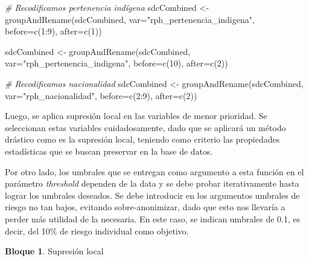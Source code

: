 \documentclass[
]{book}
\newenvironment{Shaded}{\begin{snugshade}}{\end{snugshade}}
\newcommand{\AttributeTok}[1]{\textcolor[rgb]{0.77,0.63,0.00}{#1}}
\newcommand{\CommentTok}[1]{\textcolor[rgb]{0.56,0.35,0.01}{\textit{#1}}}
\newcommand{\DecValTok}[1]{\textcolor[rgb]{0.00,0.00,0.81}{#1}}
\newcommand{\FunctionTok}[1]{\textcolor[rgb]{0.00,0.00,0.00}{#1}}
\newcommand{\NormalTok}[1]{#1}
\newcommand{\OtherTok}[1]{\textcolor[rgb]{0.56,0.35,0.01}{#1}}
\newcommand{\SpecialCharTok}[1]{\textcolor[rgb]{0.00,0.00,0.00}{#1}}
\newcommand{\StringTok}[1]{\textcolor[rgb]{0.31,0.60,0.02}{#1}}
\theoremstyle{definition}
\theoremstyle{definition}
\newtheorem{example}{Bloque}[chapter]
\theoremstyle{definition}
\theoremstyle{definition}
\theoremstyle{remark}
\begin{document}
\begin{Shaded}
\begin{Highlighting}[]
\CommentTok{\# Recodificamos pertenencia indígena}
\NormalTok{sdcCombined }\OtherTok{\textless{}{-}} \FunctionTok{groupAndRename}\NormalTok{(sdcCombined, }\AttributeTok{var=}\StringTok{"rph\_pertenencia\_indigena"}\NormalTok{,}
                              \AttributeTok{before=}\FunctionTok{c}\NormalTok{(}\DecValTok{1}\SpecialCharTok{:}\DecValTok{9}\NormalTok{), }\AttributeTok{after=}\FunctionTok{c}\NormalTok{(}\DecValTok{1}\NormalTok{))}

\NormalTok{sdcCombined }\OtherTok{\textless{}{-}} \FunctionTok{groupAndRename}\NormalTok{(sdcCombined, }\AttributeTok{var=}\StringTok{"rph\_pertenencia\_indigena"}\NormalTok{,}
                              \AttributeTok{before=}\FunctionTok{c}\NormalTok{(}\DecValTok{10}\NormalTok{), }\AttributeTok{after=}\FunctionTok{c}\NormalTok{(}\DecValTok{2}\NormalTok{))}

\CommentTok{\# Recodificamos nacionalidad}
\NormalTok{sdcCombined }\OtherTok{\textless{}{-}} \FunctionTok{groupAndRename}\NormalTok{(sdcCombined, }\AttributeTok{var=}\StringTok{"rph\_nacionalidad"}\NormalTok{,}
                              \AttributeTok{before=}\FunctionTok{c}\NormalTok{(}\DecValTok{2}\SpecialCharTok{:}\DecValTok{9}\NormalTok{), }\AttributeTok{after=}\FunctionTok{c}\NormalTok{(}\DecValTok{2}\NormalTok{))}
\end{Highlighting}
\end{Shaded}

Luego, se aplica supresión local en las variables de menor prioridad. Se seleccionan estas variables cuidadosamente, dado que se aplicará un método drástico como es la supresión local, teniendo como criterio las propiedades estadísticas que se buscan preservar en la base de datos.

Por otro lado, los umbrales que se entregan como argumento a esta función en el parámetro \emph{threshold} dependen de la data y se debe probar iterativamente hasta lograr los umbrales deseados. Se debe introducir en los argumentos umbrales de riesgo no tan bajos, evitando sobre-anonimizar, dado que esto nos llevaría a perder más utilidad de la necesaria. En este caso, se indican umbrales de 0.1, es decir, del 10\% de riesgo individual como objetivo.

\begin{example}
\protect\hypertarget{exm:bloque65nbm}{}\label{exm:bloque65nbm}Supresión local
\end{example}
\end{document}
